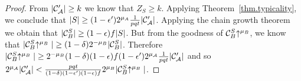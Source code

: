 \begin{proof}
    From $|\mathcal{C}'_\mathcal{A}| \geq k$ we know that $Z_S \geq k$. Applying
    Theorem~\ref{thm.typicality}, we conclude that $|S| \geq (1 -
    \epsilon')2^{\mu_A}\frac{1}{pqt}|\mathcal{C}'_\mathcal{A}|$.
    Applying the chain growth theorem \cite{backbone} we obtain that $|\mathcal{C}_B^S|
    \geq (1 - \epsilon)f|S|$. But from the goodness of $\mathcal{C}_B^S\negthickspace\uparrow^{\mu_B}$, we
    know that $|\mathcal{C}_B^S\negthickspace\uparrow^{\mu_B}| \geq (1 -
    \delta)2^{-\mu_B}|\mathcal{C}_B^S|$. Therefore $|\mathcal{C}_B^S\negthickspace\uparrow^{\mu_B}| \geq
    2^{-\mu_B}(1 - \delta)(1 - \epsilon)f(1 -
    \epsilon')2^{\mu_\mathcal{A}}\frac{1}{pqt}|\mathcal{C}'_\mathcal{A}|$ and so
    $2^{\mu_\mathcal{A}}|\mathcal{C}'_\mathcal{A}|
    <
    \frac{pqt}{(1 - \delta)(1 -
    \epsilon')(1 - \epsilon)f}2^{\mu_B}|\mathcal{C}_B^S\negthickspace\uparrow^{\mu_B}|$.
    \Qed
\end{proof}
